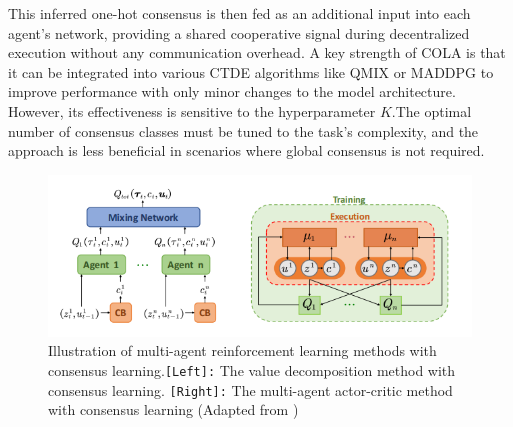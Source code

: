 This inferred one-hot consensus is then fed as an additional input into each agent's network, providing a shared cooperative signal during decentralized execution without any communication overhead. A key strength of COLA is that it can be integrated into various CTDE algorithms like QMIX or MADDPG to improve performance with only minor changes to the model architecture. However, its effectiveness is sensitive to the hyperparameter $K$.The optimal number of consensus classes must be tuned to the task's complexity, and the approach is less beneficial in scenarios where global consensus is not required.
\begin{figure}[H]
    \centering
         
    \includegraphics[width=0.6\linewidth]{img_pfe/marl_with_consensus learning.PNG}       
                \caption{Illustration of multi-agent reinforcement learning methods with consensus learning.\texttt{[Left]:} The value decomposition method with consensus learning. \texttt{[Right]:} The multi-agent actor-critic method with consensus learning (Adapted from \parencite{COLA})}
        \label{fig:marl_with_consensus_learning}
\end{figure}






